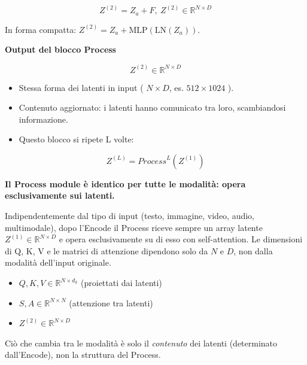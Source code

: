 \documentclass[
  11pt,
]{article}
\begin{document}
\[Z^{(2)} = Z_{a} + F,\ Z^{(2)} \in \mathbb{R}^{N \times D}\]

In forma compatta: $Z^{(2)} = Z_{a} + \mathrm{MLP}(\mathrm{LN}(Z_{a}))$.

\textbf{Output del blocco Process}

\[Z^{(2)} \in \mathbb{R}^{N \times D}\]

\begin{itemize}
\item
  Stessa forma dei latenti in input ( \(N \times D\), es.
  \(512 \times 1024\) ).
\item
  Contenuto aggiornato: i latenti hanno comunicato tra loro,
  scambiandosi informazione.
\item
  Questo blocco si ripete L volte:
\end{itemize}

\[Z^{(L)} = {Process}^{L}\left( Z^{(1)} \right)\]

\textbf{Il Process module è identico per tutte le modalità: opera esclusivamente sui latenti.}

Indipendentemente dal tipo di input (testo, immagine, video, audio, multimodale), dopo l'Encode il Process riceve sempre un array latente \(Z^{(1)} \in \mathbb{R}^{N \times D}\) e opera esclusivamente su di esso con self-attention. Le dimensioni di Q, K, V e le matrici di attenzione dipendono solo da \(N\) e \(D\), non dalla modalità dell'input originale.

\begin{itemize}
\item
  \(Q, K, V \in \mathbb{R}^{N \times d_k}\) (proiettati dai latenti)
\item
  \(S, A \in \mathbb{R}^{N \times N}\) (attenzione tra latenti)
\item
  \(Z^{(2)} \in \mathbb{R}^{N \times D}\)
\end{itemize}

Ciò che cambia tra le modalità è solo il \emph{contenuto} dei latenti (determinato dall'Encode), non la struttura del Process.
\end{document}
